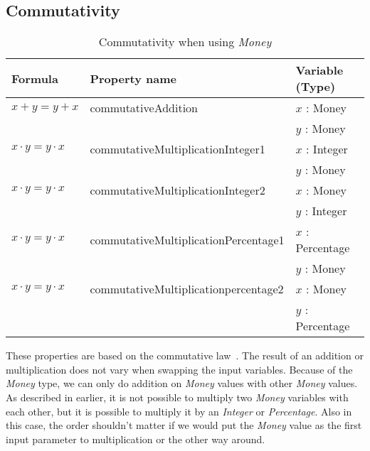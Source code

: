 \subsection*{Commutativity}
\label{ssct:properties_commutativity}
\begin{table}[!ht]
\centering
\begin{tabular}{lll}
\hline
                        \textbf{Formula} & \textbf{Property name}               & \textbf{Variable (Type)} \\ \hline
\rowcolor[HTML]{EFEFEF} $x + y = y + x$   & commutativeAddition                  & $x$ : Money                 \\
\rowcolor[HTML]{EFEFEF}                  &                                      & $y$ : Money                 \\
                        $x \cdot y = y \cdot x$   & commutativeMultiplicationInteger1    & $x$ : Integer               \\
                                         &                                      & $y$ : Money                 \\
\rowcolor[HTML]{EFEFEF} $x \cdot y = y \cdot x$   & commutativeMultiplicationInteger2    & $x$ : Money                 \\
\rowcolor[HTML]{EFEFEF}                  &                                      & $y$ : Integer               \\
                        $x \cdot y = y \cdot x$   & commutativeMultiplicationPercentage1 & $x$ : Percentage            \\
                                         &                                      & $y$ : Money                 \\
\rowcolor[HTML]{EFEFEF} $x \cdot y = y \cdot x$   & commutativeMultiplicationpercentage2 & $x$ : Money                 \\
\rowcolor[HTML]{EFEFEF}                  &                                      & $y$ : Percentage            \\ \hline
\end{tabular}
\caption{Commutativity when using \textit{Money}}
\label{tbl:ch4_money_commutativity}
\end{table}
\FloatBarrier\noindent
These properties are based on the commutative law~\cite{baumgart1961axioms}.
The result of an addition or multiplication does not vary when swapping the
input variables. Because of the \textit{Money} type, we can only do addition on
\textit{Money} values with other \textit{Money} values. As described in earlier, it is not possible to
multiply two \textit{Money} variables with each other, but it is possible to multiply it by
an \textit{Integer} or \textit{Percentage}. Also in this case, the order
shouldn't matter if we would put the \textit{Money} value as the first input
parameter to multiplication or the other way around.

